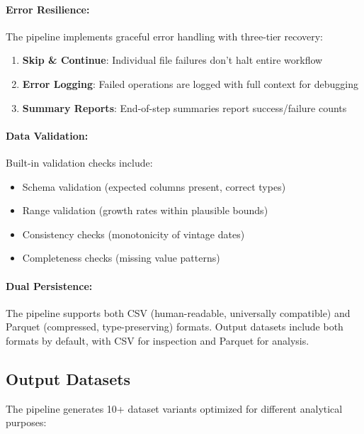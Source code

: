 \documentclass[a4paper, fleqn, 11pt]{article}
\begin{document}
\paragraph{Error Resilience:} The pipeline implements graceful error handling with three-tier recovery:
\begin{enumerate}
    \item \textbf{Skip \& Continue}: Individual file failures don't halt entire workflow
    \item \textbf{Error Logging}: Failed operations are logged with full context for debugging
    \item \textbf{Summary Reports}: End-of-step summaries report success/failure counts
\end{enumerate}

\paragraph{Data Validation:} Built-in validation checks include:
\begin{itemize}
    \item Schema validation (expected columns present, correct types)
    \item Range validation (growth rates within plausible bounds)
    \item Consistency checks (monotonicity of vintage dates)
    \item Completeness checks (missing value patterns)
\end{itemize}

\paragraph{Dual Persistence:} The pipeline supports both CSV (human-readable, universally compatible) and Parquet (compressed, type-preserving) formats. Output datasets include both formats by default, with CSV for inspection and Parquet for analysis.

\subsection{Output Datasets}

The pipeline generates 10+ dataset variants optimized for different analytical purposes:

\begin{table}[b!]
\caption{Output dataset specifications}
\label{tab:output_dataset}
\resizebox{\columnwidth}{!}{

%
}\\[2mm]
\end{table}
\end{document}
